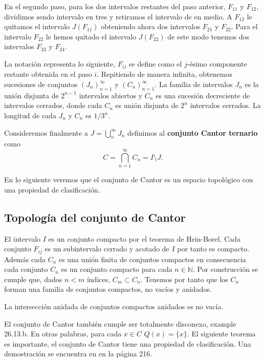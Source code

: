 \documentclass{subfiles}
\begin{document}
En el segundo paso, para los dos intervalos restantes del paso anterior, $F_{11}$ y $F_{12}$, dividimos sendo intervalo en tres y retiramos el intervalo de en medio. A $F_{12}$ le quitamos el intervalo $J(F_{11})$ obteniendo ahora dos intervalos $F_{21}$ y $F_{22}$. Para el intervalo $F_{22}$ le hemos quitado el intervalo $J(F_{22})$ de este modo tenemos dos intervalos $F_{23}$ y $F_{24}$.


La notación representa lo siguiente, $F_{ij}$ se define como el $j$-ésimo componente restante obtenida en el paso $i$. Repitiendo de manera infinita, obtenemos sucesiones de conjuntos $(J_n)_{n=1}^\infty$ y $(C_n)_{n=1}^\infty$. La familia de intervalos $J_n$ es la unión disjunta de $2^{n-1}$ intervalos abiertos y $C_n$ es una sucesión decreciente de intervalos cerrados, donde cada $C_n$ es unión disjunta de $2^n$ intervalos cerrados. La longitud de cada $J_n$ y $C_n$ es $1/3^n.$

Consideremos finalmente a $J=\bigcup_{n }^{\infty}  J_n$ definimos al \textbf{conjunto Cantor ternario} como $$C=\bigcap_{n=1}^\infty C_n=I \setminus J.$$ 

En lo siguiente veremos que el conjunto de Cantor es un espacio topológico con una propiedad de clasificación. 

\subsection*{Topología del conjunto de Cantor}

El intervalo $I$ es un conjunto compacto por el teorema de Hein-Borel. Cada conjunto $F_{ij}$ es un subintervalo cerrado y acotado de $I$ por tanto es compacto. Además cada $C_n$ es una unión finita de conjuntos compactos en consecuencia cada conjunto $C_n$ es un conjunto compacto para cada $n \in \mathbb{N}$. Por construcción se cumple que, dados $n < m $ índices, $C_m \subset C_n$. Tenemos por tanto que los $C_n$ forman una familia de conjuntos compactos, no vacíos y anidados. 

\begin{lm}
La intersección anidada de conjuntos compactos anidados es no vacía. 
\end{lm} 



 El conjunto de Cantor también cumple ser totalmente disconexo, \cite{top_willd} example 26.13.b. En otras palabras, para cada $x \in C$ $Q(x)=\{x\}$. El siguiente teorema es importante, el conjunto de Cantor tiene una propiedad de clasificación.  Una demostración se encuentra en \cite{top_willd} en la página 216.
\end{document}
